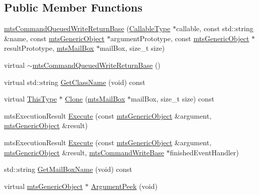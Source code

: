 \subsection*{Public Member Functions}
\begin{DoxyCompactItemize}
\item 
\hyperlink{classmts_command_queued_write_return_base_a972b13c4891a8cc227d8c59062a8d584}{mts\+Command\+Queued\+Write\+Return\+Base} (\hyperlink{classmts_command_queued_write_return_base_aa8635b9bab77a8e15f53f9f80415c420}{Callable\+Type} $\ast$callable, const std\+::string \&name, const \hyperlink{classmts_generic_object}{mts\+Generic\+Object} $\ast$argument\+Prototype, const \hyperlink{classmts_generic_object}{mts\+Generic\+Object} $\ast$result\+Prototype, \hyperlink{classmts_mail_box}{mts\+Mail\+Box} $\ast$mail\+Box, size\+\_\+t size)
\item 
virtual \hyperlink{classmts_command_queued_write_return_base_a73ca5f69553a4d5d8340478c4bfbf2b8}{$\sim$mts\+Command\+Queued\+Write\+Return\+Base} ()
\item 
virtual std\+::string \hyperlink{classmts_command_queued_write_return_base_af935b4426ac0e239aea6ab1dba2499c3}{Get\+Class\+Name} (void) const 
\item 
virtual \hyperlink{classmts_command_queued_write_return_base_af2f07528dc98cd88ab385e995f95a368}{This\+Type} $\ast$ \hyperlink{classmts_command_queued_write_return_base_a7e55f1214273ccfeaf3a32d64dd4b59a}{Clone} (\hyperlink{classmts_mail_box}{mts\+Mail\+Box} $\ast$mail\+Box, size\+\_\+t size) const 
\item 
mts\+Execution\+Result \hyperlink{classmts_command_queued_write_return_base_a9d972591c75d86c91e3b0746c35ff70c}{Execute} (const \hyperlink{classmts_generic_object}{mts\+Generic\+Object} \&argument, \hyperlink{classmts_generic_object}{mts\+Generic\+Object} \&result)
\item 
mts\+Execution\+Result \hyperlink{classmts_command_queued_write_return_base_a0da939240489bc0eee567225598aeb10}{Execute} (const \hyperlink{classmts_generic_object}{mts\+Generic\+Object} \&argument, \hyperlink{classmts_generic_object}{mts\+Generic\+Object} \&result, \hyperlink{classmts_command_write_base}{mts\+Command\+Write\+Base} $\ast$finished\+Event\+Handler)
\item 
std\+::string \hyperlink{classmts_command_queued_write_return_base_ab7ed86a72f83e9f4a8746d199c41670a}{Get\+Mail\+Box\+Name} (void) const 
\item 
virtual \hyperlink{classmts_generic_object}{mts\+Generic\+Object} $\ast$ \hyperlink{classmts_command_queued_write_return_base_a401a5f448de3fccd1fb164443e4950c1}{Argument\+Peek} (void)

\end{DoxyCompactItemize}
